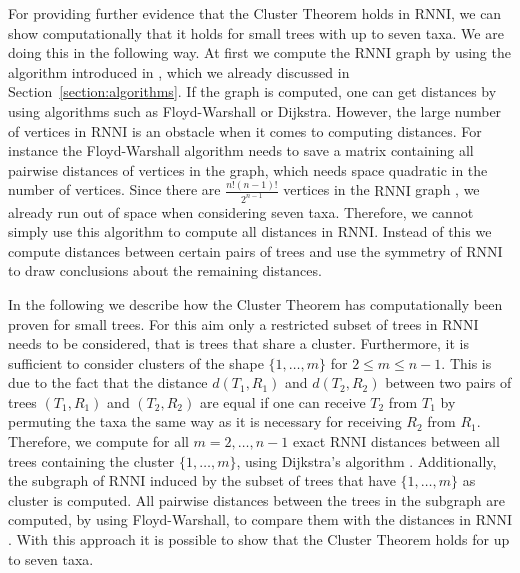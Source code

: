 \documentclass{amsart}
\newcommand{\rnni}{\mathrm{RNNI}}
\begin{document}



For providing further evidence that the Cluster Theorem holds in $\rnni$, we can show computationally that it holds for small trees with up to seven taxa.
We are doing this in the following way.
At first we compute the $\rnni$ graph by using the algorithm introduced in \autocite{Gavryushkin2018-ol}, which we already discussed in Section~\ref{section:algorithms}.
If the graph is computed, one can get distances by using algorithms such as Floyd-Warshall \autocite{Floyd1962-ew} or Dijkstra\autocite{Dijkstra1959-ph}.
However, the large number of vertices in $\rnni$ is an obstacle when it comes to computing distances.
For instance the Floyd-Warshall algorithm needs to save a matrix containing all pairwise distances of vertices in the graph, which needs space quadratic in the number of vertices.
Since there are $\frac{n!(n-1)!}{2^{n-1}}$ vertices in the $\rnni$ graph \autocite{Gavryushkin2018-ol}, we already run out of space when considering seven taxa.
Therefore, we cannot simply use this algorithm to compute all distances in $\rnni$.
Instead of this we compute distances between certain pairs of trees and use the symmetry of $\rnni$ to draw conclusions about the remaining distances.

In the following we describe how the Cluster Theorem has computationally been proven for small trees.
For this aim only a restricted subset of trees in $\rnni$ needs to be considered, that is trees that share a cluster.
Furthermore, it is sufficient to consider clusters of the shape $\{1, \ldots, m\}$ for $2 \leq m \leq n-1$.
This is due to the fact that the distance $d(T_1,R_1)$ and $d(T_2,R_2)$ between two pairs of trees $(T_1,R_1)$ and $(T_2,R_2)$ are equal if one can receive $T_2$ from $T_1$ by permuting the taxa the same way as it is necessary for receiving $R_2$ from $R_1$.
Therefore, we compute for all $m = 2, \ldots, n-1$ exact $\rnni$ distances between all trees containing the cluster $\{1, \ldots, m\}$, using Dijkstra's algorithm \autocite{Dijkstra1959-ph}.
Additionally, the subgraph of $\rnni$ induced by the subset of trees that have $\{1, \ldots, m\}$ as cluster is computed.
All pairwise distances between the trees in the subgraph are computed, by using Floyd-Warshall, to compare them with the distances in $\rnni$.
With this approach it is possible to show that the Cluster Theorem holds for up to seven taxa. 
\end{document}
